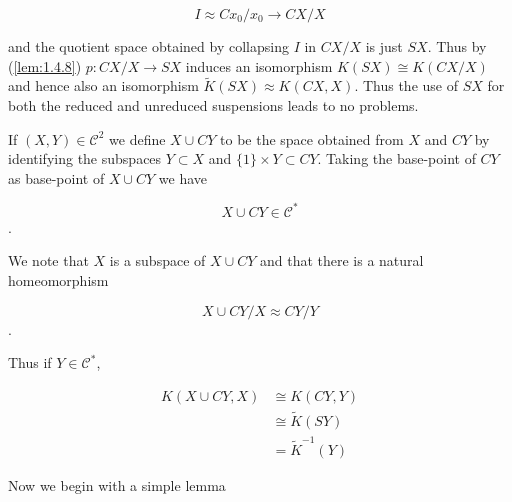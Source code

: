 \begin{equation*}
    I \approx Cx_0 / x_0 \to CX/X
\end{equation*}

and the quotient space obtained by collapsing $I$ in $CX/X$ is just $SX$. Thus by (\ref{lem:1.4.8}) $p: CX/X \to SX$ induces an isomorphism $K(SX) \cong K(CX/X)$ and hence also an isomorphism $\tilde{K}(SX) \approx K(CX,X)$. Thus the use of $SX$ for both the reduced and unreduced suspensions leads to no problems. \par

If $(X, Y) \in \mathcal{C}^2$ we define $X \cup CY$ to be the space obtained from $X$ and $CY$ by identifying the subspaces $Y \subset X$ and $\{1\} \times Y \subset CY$. Taking the base-point of $CY$ as base-point of $X \cup CY$ we have

\begin{equation*}
    X \cup CY \in \mathcal{C}^*
\end{equation*}.

We note that $X$ is a subspace of $X \cup CY$ and that there is a natural homeomorphism

\begin{equation*}
    X \cup CY/X \approx CY/Y
\end{equation*}.

Thus if $Y \in \mathcal{C}^*$,

\begin{align*}
    K(X \cup CY, X) &\cong K(CY, Y) \\
    &\cong \tilde{K}(SY) \\
    &= \tilde{K}^{-1}(Y)
\end{align*}

Now we begin with a simple lemma
